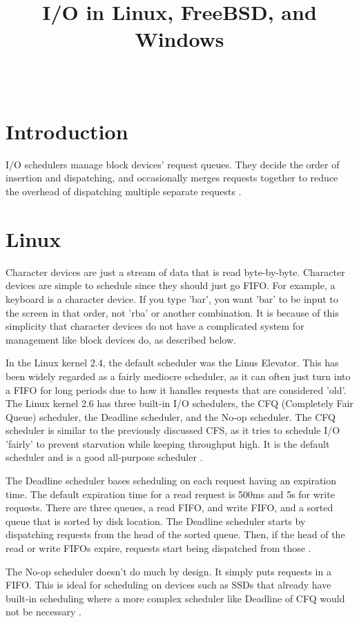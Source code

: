 \documentclass[10pt,draftclsnofoot,onecolumn,journal,compsoc]{IEEEtran}
\title{I/O in Linux, FreeBSD, and Windows}
\author{
  \IEEEauthorblockN{Heidi Clayton} \\
  \IEEEauthorblockA{CS 444: Operating Systems II Spring 2017 \\ Oregon State University}
}
\begin{document}
\maketitle
\newpage
\tableofcontents
\newpage
\section{Introduction}
I/O schedulers manage block devices' request queues. They decide the order of insertion and dispatching, and occasionally merges requests together to reduce the overhead of dispatching multiple separate requests \cite{linux1}.

\section{Linux}
Character devices are just a stream of data that is read byte-by-byte. Character devices are simple to schedule since they should just go FIFO. For example, a keyboard is a character device. If you type 'bar', you want 'bar' to be input to the screen in that order, not 'rba' or another combination. It is because of this simplicity that character devices do not have a complicated system for management like block devices do, as described below. \cite{linux1}

In the Linux kernel 2.4, the default scheduler was the Linus Elevator. This has been widely regarded as a fairly mediocre scheduler, as it can often just turn into a FIFO for long periods due to how it handles requests that are considered 'old'. The Linux kernel 2.6 has three built-in I/O schedulers, the CFQ (Completely Fair Queue) scheduler, the Deadline scheduler, and the No-op scheduler. The CFQ scheduler is similar to the previously discussed CFS, as it tries to schedule I/O 'fairly' to prevent starvation while keeping throughput high. It is the default scheduler and is a good all-purpose scheduler \cite{linux1}. 

The Deadline scheduler bases scheduling on each request having an expiration time. The default expiration time for a read request is 500ms and 5s for write requests. There are three queues, a read FIFO, and write FIFO, and a sorted queue that is sorted by disk location. The Deadline scheduler starts by dispatching requests from the head of the sorted queue. Then, if the head of the read or write FIFOs expire, requests start being dispatched from those \cite{linux1}. 

The No-op scheduler doesn't do much by design. It simply puts requests in a FIFO. This is ideal for scheduling on devices such as SSDs that already have built-in scheduling where a more complex scheduler like Deadline of CFQ would not be necessary \cite{linux1}. 
\end{document}
